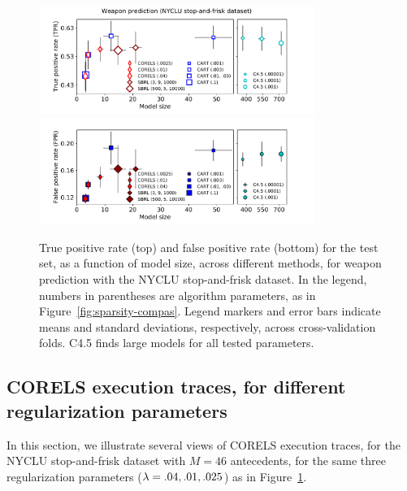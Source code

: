\begin{figure}[t!]
\begin{center}
\includegraphics[trim={17mm, 0mm, 27mm, 0mm},
width=0.8\textwidth]{figs/weapon-sparsity-tpr.pdf}
\includegraphics[trim={17mm, 10mm, 27mm, 4mm},
width=0.8\textwidth]{figs/weapon-sparsity-fpr.pdf}
\end{center}
\caption{True positive rate (top) and false positive rate (bottom)
for the test set, as a function of model size, across different methods,
for weapon prediction with the NYCLU stop-and-frisk dataset.
%
In the legend, numbers in parentheses are algorithm parameters,
as in Figure~\ref{fig:sparsity-compas}.
%
Legend markers and error bars indicate means and standard deviations,
respectively, across cross-validation folds.
%
%
C4.5 finds large models for all tested parameters.
}
\label{fig:sparsity-weapon}
\end{figure}

\subsection{CORELS execution traces, for different regularization parameters}
\label{sec:reg-param}
In this section, we illustrate several views of CORELS execution traces,
for the NYCLU stop-and-frisk dataset with ${M = 46}$ antecedents,
for the same three regularization parameters (${{\lambda} = .04, .01, .025}$)
as in Figure~\ref{fig:sparsity-weapon}.

